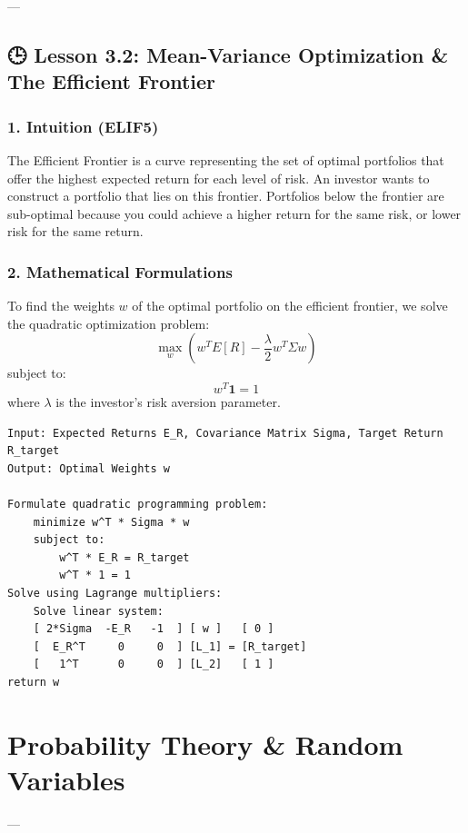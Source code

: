 \documentclass[11pt,oneside]{book}
\begin{document}
---

\section{🕒 Lesson 3.2: Mean-Variance Optimization \& The Efficient Frontier}

\subsection{1. Intuition (ELIF5)}
The Efficient Frontier is a curve representing the set of optimal portfolios that offer the highest expected return for each level of risk. An investor wants to construct a portfolio that lies on this frontier. Portfolios below the frontier are sub-optimal because you could achieve a higher return for the same risk, or lower risk for the same return.

\subsection{2. Mathematical Formulations}
To find the weights $w$ of the optimal portfolio on the efficient frontier, we solve the quadratic optimization problem:
$$\max_{w} \left( w^T E[R] - \frac{\lambda}{2} w^T \Sigma w \right)$$
subject to:
$$w^T \mathbf{1} = 1$$
where $\lambda$ is the investor's risk aversion parameter.

\begin{tcolorbox}[colback=white,colframe=black,boxrule=0.6pt,arc=0mm,title=Mean-Variance Portfolio Frontier]
\begin{verbatim}
Input: Expected Returns E_R, Covariance Matrix Sigma, Target Return R_target
Output: Optimal Weights w

Formulate quadratic programming problem:
    minimize w^T * Sigma * w
    subject to:
        w^T * E_R = R_target
        w^T * 1 = 1
Solve using Lagrange multipliers:
    Solve linear system:
    [ 2*Sigma  -E_R   -1  ] [ w ]   [ 0 ]
    [  E_R^T     0     0  ] [L_1] = [R_target]
    [   1^T      0     0  ] [L_2]   [ 1 ]
return w
\end{verbatim}
\end{tcolorbox}


\newpage

\chapter{Probability Theory & Random Variables}

---
\end{document}

